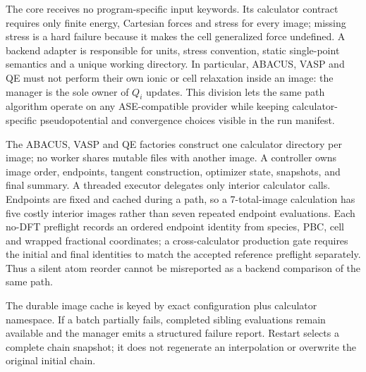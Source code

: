 \documentclass[final,3p,times]{elsarticle}
\begin{document}
The core receives no program-specific input keywords.  Its calculator contract
requires only finite energy, Cartesian forces and stress for every image;
missing stress is a hard failure because it makes the cell generalized force
undefined.  A backend adapter is responsible for units, stress convention,
static single-point semantics and a unique working directory.  In particular,
ABACUS, VASP and QE must not perform their own ionic or cell relaxation inside
an image: the manager is the sole owner of $Q_i$ updates.  This division lets
the same path algorithm operate on any ASE-compatible provider while keeping
calculator-specific pseudopotential and convergence choices visible in the
run manifest.

The ABACUS, VASP and QE factories construct one calculator directory per image;
no worker shares mutable files with another image. A controller owns image
order, endpoints, tangent construction, optimizer state, snapshots, and final
summary. A threaded executor delegates only interior calculator calls.
Endpoints are fixed and cached during a path, so a 7-total-image calculation
has five costly interior images rather than seven repeated endpoint evaluations.
Each no-DFT preflight records an ordered endpoint identity from species, PBC,
cell and wrapped fractional coordinates; a cross-calculator production gate
requires the initial and final identities to match the accepted reference
preflight separately. Thus a silent atom reorder cannot be misreported as a
backend comparison of the same path.

The durable image cache is keyed by exact configuration plus calculator
namespace. If a batch partially fails, completed sibling evaluations remain
available and the manager emits a structured failure report. Restart selects a
complete chain snapshot; it does not regenerate an interpolation or overwrite
the original initial chain.
\end{document}
